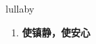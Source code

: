
\begin{frame}
{\huge lullaby}
\begin{center}
\begin{enumerate}\Large
  \item \textbf{使镇静，使安心}
\end{enumerate}
\end{center}
\end{frame}
